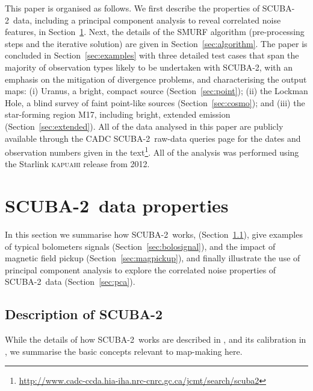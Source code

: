 \documentclass[useAMS,usenatbib,nofootinbib]{mn2e}
\newcommand{\scuba}{SCUBA-2}
\begin{document}
This paper is organised as follows. We first describe the properties
of \scuba\ data, including a principal component analysis to reveal
correlated noise features, in Section~\ref{sec:data}. Next, the
details of the SMURF algorithm (pre-processing steps and the iterative
solution) are given in Section~\ref{sec:algorithm}. The paper is
concluded in Section~\ref{sec:examples} with three detailed test cases
that span the majority of observation types likely to be undertaken
with \scuba, with an emphasis on the mitigation of divergence
problems, and characterising the output maps: (i) Uranus, a bright,
compact source (Section~\ref{sec:point}); (ii) the Lockman Hole, a
blind survey of faint point-like sources (Section~\ref{sec:cosmo});
and (iii) the star-forming region M17, including bright, extended
emission (Section~\ref{sec:extended}). All of the data analysed in
this paper are publicly available through the CADC \scuba\ raw-data
queries page for the dates and observation numbers given in the
text\footnote{\url{http://www.cadc-ccda.hia-iha.nrc-cnrc.gc.ca/jcmt/search/scuba2}}.
All of the analysis was performed using the Starlink \textsc{kapuahi}
release from 2012.

\section{\scuba\ data properties}
\label{sec:data}

In this section we summarise how \scuba\ works,
(Section~\ref{sec:bolos}), give examples of typical bolometers signals
(Section~\ref{sec:bolosignal}), and the impact of magnetic field
pickup (Section~\ref{sec:magpickup}), and finally illustrate the use
of principal component analysis to explore the correlated noise
properties of \scuba\ data (Section~\ref{sec:pca}).

\subsection{Description of \scuba}
\label{sec:bolos}

While the details of how \scuba\ works are described in
\citet{holland2012}, and its calibration in \citet{dempsey2012}, we
summarise the basic concepts relevant to map-making here.
\end{document}
